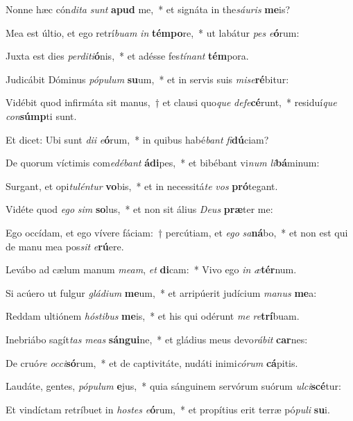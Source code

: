 \item Nonne hæc cón\textit{di}\textit{ta} \textit{sunt} \textbf{a}\textbf{pud} me,~* et signáta in the\textit{sáu}\textit{ris} \textbf{me}is?
\item Mea est últio, et ego retrí\textit{bu}\textit{am} \textit{in} \textbf{tém}\textbf{po}re,~* ut labátur \textit{pes} \textit{e}\textbf{ó}rum:
\item Juxta est dies \textit{per}\textit{di}\textit{ti}\textbf{ó}nis,~* et adésse fes\textit{tí}\textit{nant} \textbf{tém}pora.
\item Judicábit Dóminus \textit{pó}\textit{pu}\textit{lum} \textbf{su}um,~* et in servis suis \textit{mi}\textit{se}\textbf{ré}bitur:
\item Vidébit quod infirmáta sit manus,~† et clausi quo\textit{que} \textit{de}\textit{fe}\textbf{cé}runt,~* residuí\textit{que} \textit{con}\textbf{súmp}ti sunt.
\item Et dicet: Ubi sunt \textit{di}\textit{i} \textit{e}\textbf{ó}rum,~* in quibus habé\textit{bant} \textit{fi}\textbf{dú}ciam?
\item De quorum víctimis com\textit{e}\textit{dé}\textit{bant} \textbf{á}\textbf{di}pes,~* et bibébant vi\textit{num} \textit{li}\textbf{bá}minum:
\item Surgant, et opi\textit{tu}\textit{lén}\textit{tur} \textbf{vo}bis,~* et in necessitá\textit{te} \textit{vos} \textbf{pró}tegant.
\item Vidéte quod \textit{e}\textit{go} \textit{sim} \textbf{so}lus,~* et non sit álius \textit{De}\textit{us} \textbf{præ}ter me:
\item Ego occídam, et ego vívere fáciam:~† percútiam, et \textit{e}\textit{go} \textit{sa}\textbf{ná}bo,~* et non est qui de manu mea pos\textit{sit} \textit{e}\textbf{rú}ere.
\item Levábo ad cælum manum \textit{me}\textit{am}, \textit{et} \textbf{di}cam:~* Vivo ego \textit{in} \textit{æ}\textbf{tér}num.
\item Si acúero ut fulgur \textit{glá}\textit{di}\textit{um} \textbf{me}um,~* et arripúerit judícium \textit{ma}\textit{nus} \textbf{me}a:
\item Reddam ultiónem \textit{hós}\textit{ti}\textit{bus} \textbf{me}is,~* et his qui odérunt \textit{me} \textit{re}\textbf{trí}buam.
\item Inebriábo sagít\textit{tas} \textit{me}\textit{as} \textbf{sán}\textbf{gui}ne,~* et gládius meus devo\textit{rá}\textit{bit} \textbf{car}nes:
\item De cruó\textit{re} \textit{oc}\textit{ci}\textbf{só}rum,~* et de captivitáte, nudáti inimi\textit{có}\textit{rum} \textbf{cá}pitis.
\item Laudáte, gentes, \textit{pó}\textit{pu}\textit{lum} \textbf{e}jus,~* quia sánguinem servórum suórum \textit{ul}\textit{ci}\textbf{scé}tur:
\item Et vindíctam retríbuet in \textit{hos}\textit{tes} \textit{e}\textbf{ó}rum,~* et propítius erit terræ pó\textit{pu}\textit{li} \textbf{su}i.
